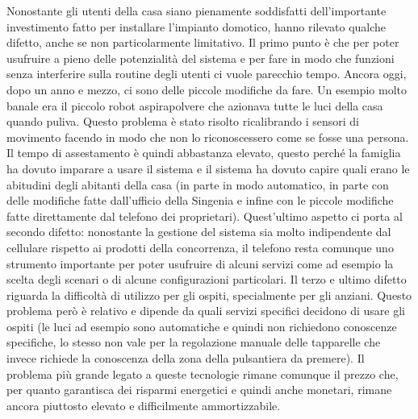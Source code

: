 Nonostante gli utenti della casa siano pienamente soddisfatti dell’importante investimento fatto per installare l’impianto domotico, hanno rilevato qualche difetto, anche se non particolarmente limitativo. Il primo punto è che per poter usufruire a pieno delle potenzialità del sistema e per fare in modo che funzioni senza interferire sulla routine degli utenti ci vuole parecchio tempo. Ancora oggi, dopo un anno e mezzo, ci sono delle piccole modifiche da fare. Un esempio molto banale era il piccolo robot aspirapolvere che azionava tutte le luci della casa quando puliva. Questo problema è stato risolto ricalibrando i sensori di movimento facendo in modo che non lo riconoscessero come se fosse una persona. Il tempo di assestamento è quindi abbastanza elevato, questo perché la famiglia ha dovuto imparare a usare il sistema e il sistema ha dovuto capire quali erano le abitudini degli abitanti della casa (in parte in modo automatico, in parte con delle modifiche fatte dall’ufficio della Singenia e infine con le piccole modifiche fatte direttamente dal telefono dei proprietari). Quest’ultimo aspetto ci porta al secondo difetto: nonostante la gestione del sistema sia molto indipendente dal cellulare rispetto ai prodotti della concorrenza, il telefono resta comunque uno strumento importante per poter usufruire di alcuni servizi come ad esempio la scelta degli scenari o di alcune configurazioni particolari. Il terzo e ultimo difetto riguarda la difficoltà di utilizzo per gli ospiti, specialmente per gli anziani. Questo problema però è relativo e dipende da quali servizi specifici decidono di usare gli ospiti (le luci ad esempio sono automatiche e quindi non richiedono conoscenze specifiche, lo stesso non vale per la regolazione manuale delle tapparelle che invece richiede la conoscenza della zona della pulsantiera da premere). Il problema più grande legato a queste tecnologie rimane comunque il prezzo che, per quanto garantisca dei risparmi energetici e quindi anche monetari, rimane ancora piuttosto elevato e difficilmente ammortizzabile.

